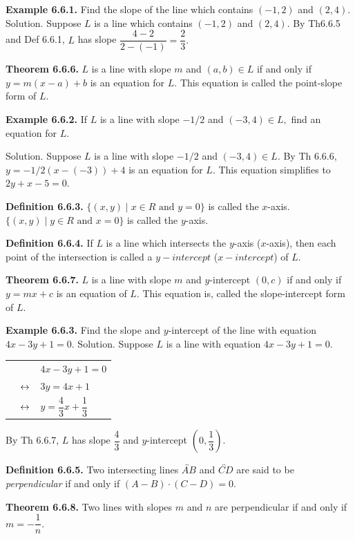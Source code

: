 \textbf{Example 6.6.1.} Find the slope of the line which contains $(-1,2)$ and $(2,4).$\nl
Solution. Suppose $L$ is a line which contains $(-1,2)$ and $(2,4).$ By Th6.6.5 and Def 6.6.1, $L$ has slope
$\dfrac{4 - 2}{2 - (-1)} = \dfrac{2}{3}.$\nl

\textbf{Theorem 6.6.6.} $L$ is a line with slope $m$ and $(a,b)\in L$ if and only if $y = m(x-a) + b$ is an equation for $L.$ This equation is called the point-slope form of $L.$\nl

\textbf{Example 6.6.2.} If $L$ is a line with slope $- 1/2$ and $(-3,4)\in L,$ find an equation for $L.$\nl

\newpage

Solution. Suppose $L$ is a line with slope $- 1/2$ and $(-3,4)\in L.$ By Th 6.6.6, $y =-1/2(x-(-3)) + 4$ is an equation for $L.$ This equation simplifies to $2y + x - 5 =0. $\nl

\textbf{Definition 6.6.3.} $\{(x,y) \mid x\in R \text{~and~} y = 0\}$ is called the $x$-axis. $\{ (x,y) \mid y\in R \text{~and~} x = 0\}$ is called the $y$-axis. \nl

\textbf{Definition 6.6.4.} If $L$ is a line which intersects the $y$-axis ($x$-axis),
then each point of the intersection is called a $y-intercept$ ($x-intercept$) of $L.$\nl

\textbf{Theorem 6.6.7.} $L$ is a line with slope $m$ and $y$-intercept $(0, c)$ if and only if $y = mx + c$ is an equation of $L.$ This equation is, called the slope-intercept form of $L. $\nl

\textbf{Example 6.6.3.} Find the slope and $y$-intercept of the line with equation $4x - 3y + 1 =0.$\nl
Solution. Suppose $L$ is a line with equation $4x - 3y + 1 = 0.$
\begin{tabular}{r r l}
&&$4x - 3y + 1 = 0$\\
&$\leftrightarrow$&$3y = 4x + 1$\\
&$\leftrightarrow$&$y = \dfrac{4}{3}x + \dfrac{1}{3}$\\
\end{tabular}\nl

By Th 6.6.7, $L$ has slope $\dfrac{4}{3}$ and $y$-intercept $\left(0,\dfrac{1}{3}\right).$\nl

\textbf{Definition 6.6.5.} Two intersecting lines $\overleftrightarrow{AB}$ and $\overleftrightarrow{CD}$ are said to be \textit{perpendicular} if and only if $(A-B)\cdot(C-D) = 0.$\nl

\textbf{Theorem 6.6.8.} Two lines with slopes $m$ and $n$ are perpendicular if and only if $m = -\dfrac{1}{n}.$\nl

